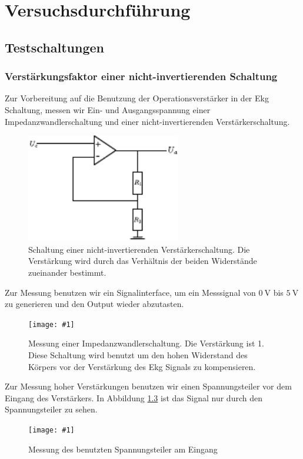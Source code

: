 \newcommand{\mess}[3] {
\begin{figure}[htb]
	\centering
	\texttt{[image: \#1]}
	\caption{#2}
	\label{#3}
\end{figure} }
\newcommand{\refabb}[1]{(siehe Abb. \ref{#1})}

\chapter{Versuchsdurchführung}
\section{Testschaltungen}
\subsection{Verstärkungsfaktor einer nicht-invertierenden Schaltung}
Zur Vorbereitung auf die Benutzung der Operationsverstärker in der Ekg
Schaltung, messen wir Ein- und Ausgangsspannung einer Impedanzwandlerschaltung
und einer nicht-invertierenden Verstärkerschaltung.
\begin{figure}[htb]
    \centering
    \includegraphics[width=0.6\textwidth]{Abb/nicht-inv.pdf}
    \caption{Schaltung einer nicht-invertierenden Verstärkerschaltung. Die
Verstärkung wird durch das Verhältnis der beiden Widerstände zueinander
bestimmt.}
    \label{ninv}
\end{figure}
Zur Messung benutzen wir ein Signalinterface, um ein Messsignal von
$\SI{0}{\volt}$ bis $\SI{5}{\volt}$ zu generieren und den Output wieder
abzutasten. 
\mess{Mess/Op/faktor1.pdf}{Messung einer Impedanzwandlerschaltung. Die
Verstärkung ist 1. Diese Schaltung wird benutzt um den hohen Widerstand des
Körpers vor der Verstärkung des Ekg Signals zu kompensieren.}{imp}
Zur Messung hoher Verstärkungen benutzen wir einen Spannungsteiler vor dem
Eingang des Verstärkers. In Abbildung \ref{spann} ist das Signal nur durch den
Spannungsteiler zu sehen.
\mess{Mess/Op/spannungsteiler.pdf}{Messung des benutzten Spannungsteiler am
Eingang}{spann}
